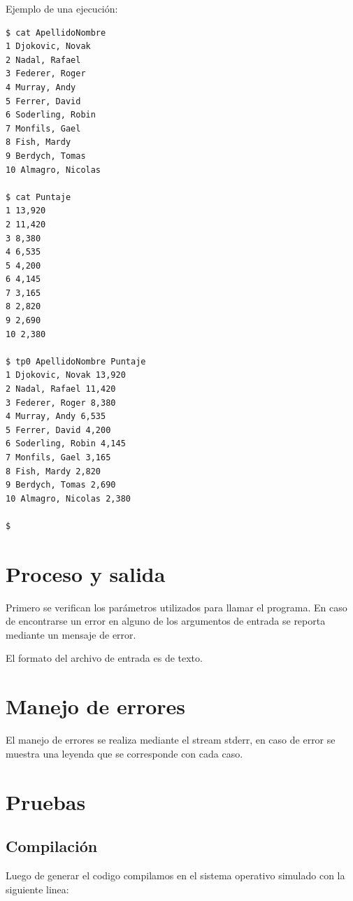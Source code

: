 \documentclass[a4paper,11pt]{article}
\begin{document}
\begin{itemize}
\begin{verbatim}
\end{verbatim}

Ejemplo de una ejecuci\'on:
\begin{verbatim}
$ cat ApellidoNombre
1 Djokovic, Novak
2 Nadal, Rafael
3 Federer, Roger
4 Murray, Andy
5 Ferrer, David
6 Soderling, Robin
7 Monfils, Gael
8 Fish, Mardy
9 Berdych, Tomas
10 Almagro, Nicolas

$ cat Puntaje
1 13,920
2 11,420
3 8,380
4 6,535
5 4,200
6 4,145
7 3,165
8 2,820
9 2,690
10 2,380

$ tp0 ApellidoNombre Puntaje
1 Djokovic, Novak 13,920
2 Nadal, Rafael 11,420
3 Federer, Roger 8,380
4 Murray, Andy 6,535
5 Ferrer, David 4,200
6 Soderling, Robin 4,145
7 Monfils, Gael 3,165
8 Fish, Mardy 2,820
9 Berdych, Tomas 2,690
10 Almagro, Nicolas 2,380

$

\end{verbatim}

\end{itemize}

\newpage

\section{Proceso y salida}

Primero se verifican los par\'ametros utilizados para llamar el programa. En caso de encontrarse un error en alguno de los argumentos de entrada se reporta mediante un mensaje de error.

El formato del archivo de entrada es de texto. 

\section{Manejo de errores}

El manejo de errores se realiza mediante el stream stderr, en caso de error se muestra una leyenda que se corresponde con cada caso.


\newpage
\section{Pruebas}

\subsection{Compilaci\'on}
Luego de generar el codigo compilamos en el sistema operativo simulado con la siguiente linea:\\
\end{document}
